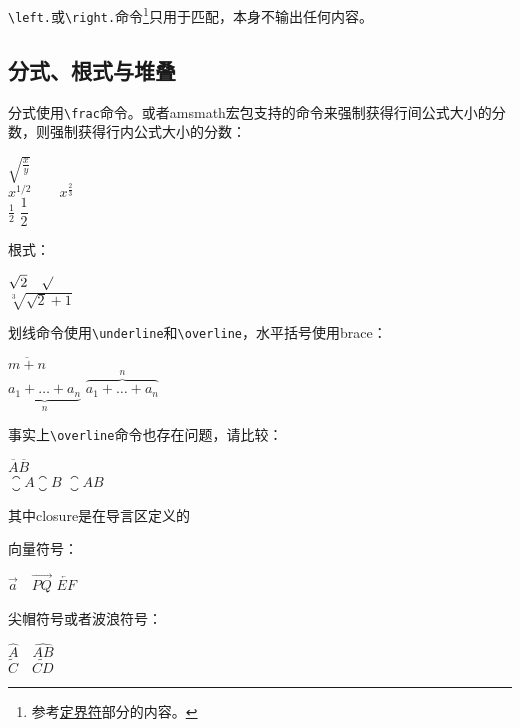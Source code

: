 {\verb|\left.|或\verb|\right.|命令\footnote{参考\hyperref[subsec:delimiter]{定界符}部分的内容。}只用于匹配，本身不输出任何内容。

\subsection{分式、根式与堆叠}
分式使用\verb|\frac|命令。或者amsmath宏包支持的\latexline{\\dfrac}命令来强制获得行间公式大小的分数，\latexline{\\tfrac}则强制获得行内公式大小的分数：

\begin{codeshow}
$\sqrt{\frac{x}{y}}$ \\
$x^{1/2} \qquad x^{\frac{2}{3}}$\\
$\tfrac{1}{2}$ \quad $\dfrac{1}{2}$
\end{codeshow}

根式：

\begin{codeshow}
$\sqrt{2} \quad \surd$ \\
$\sqrt[3]{\sqrt{2}+1}$
\end{codeshow}

划线命令使用\verb|\underline|和\verb|\overline|，水平括号使用brace：

\begin{codeshow}
$\overline{m+n}$ \\
$\underbrace{a_1+\ldots+a_n}_{n}$
$\overbrace{a_1+\ldots+a_n}^{n}$
\end{codeshow}

事实上\verb|\overline|命令也存在问题，请比较：

\begin{codeshow}
$\overline{A}\overline{B}$ \\
$\closure{A}\closure{B}$
$\closure{AB}$
\end{codeshow}

其中closure是在导言区定义的
\begin{latex}{}
\newcommand{\closure}[2][3]{{}\mkern#1mu
  \overline{\mkern-#1mu#2}}
\end{latex}

向量符号：

\begin{codeshow}
  $\vec a\quad\overrightarrow{PQ}$
  $\overleftarrow{EF}$
\end{codeshow}

尖帽符号或者波浪符号：

\begin{codeshow}
  $\hat{A} \quad \widehat{AB}$ \\
  $\tilde{C} \quad \widetilde{CD}$
\end{codeshow}

}
